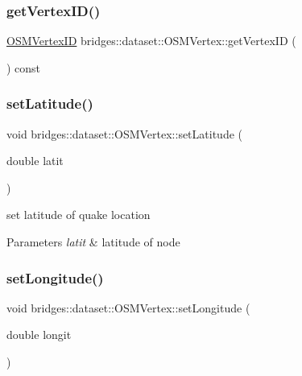 \subsubsection{\texorpdfstring{get\+Vertex\+I\+D()}{getVertexID()}}
{\footnotesize\ttfamily \hyperlink{classbridges_1_1dataset_1_1_o_s_m_vertex_ad166f13b0aefbdc05a273546f2a3bb96}{O\+S\+M\+Vertex\+ID} bridges\+::dataset\+::\+O\+S\+M\+Vertex\+::get\+Vertex\+ID (\begin{DoxyParamCaption}{ }\end{DoxyParamCaption}) const\hspace{0.3cm}{\ttfamily [inline]}}

\mbox{\label{classbridges_1_1dataset_1_1_o_s_m_vertex_af4ab2d69122919f504b78bd9540ccaa1}} 
\subsubsection{\texorpdfstring{set\+Latitude()}{setLatitude()}}
{\footnotesize\ttfamily void bridges\+::dataset\+::\+O\+S\+M\+Vertex\+::set\+Latitude (\begin{DoxyParamCaption}\item[{double}]{latit }\end{DoxyParamCaption})\hspace{0.3cm}{\ttfamily [inline]}}

set latitude of quake location


\begin{DoxyParams}{Parameters}
{\em latit} & latitude of node \\
\hline
\end{DoxyParams}
\mbox{\label{classbridges_1_1dataset_1_1_o_s_m_vertex_a48e077133233ba705342ba955c6fdc23}} 
\subsubsection{\texorpdfstring{set\+Longitude()}{setLongitude()}}
{\footnotesize\ttfamily void bridges\+::dataset\+::\+O\+S\+M\+Vertex\+::set\+Longitude (\begin{DoxyParamCaption}\item[{double}]{longit }\end{DoxyParamCaption})\hspace{0.3cm}{\ttfamily [inline]}}

